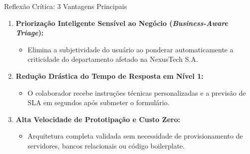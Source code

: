 \documentclass[aspectratio=169, 10pt]{beamer}
\begin{document}
\begin{frame}{Reflexão Crítica: 3 Vantagens Principais}
    \begin{enumerate}
        \item \textbf{Priorização Inteligente Sensível ao Negócio (\textit{Business-Aware Triage}):}
        \begin{itemize}
            \item Elimina a subjetividade do usuário ao ponderar automaticamente a criticidade do departamento afetado na NexusTech S.A.
        \end{itemize}
        \vspace{0.2cm}
        \item \textbf{Redução Drástica do Tempo de Resposta em Nível 1:}
        \begin{itemize}
            \item O colaborador recebe instruções técnicas personalizadas e a previsão de SLA em segundos após submeter o formulário.
        \end{itemize}
        \vspace{0.2cm}
        \item \textbf{Alta Velocidade de Prototipação e Custo Zero:}
        \begin{itemize}
            \item Arquitetura completa validada sem necessidade de provisionamento de servidores, bancos relacionais ou código boilerplate.
        \end{itemize}
    \end{enumerate}
\end{frame}
\end{document}
